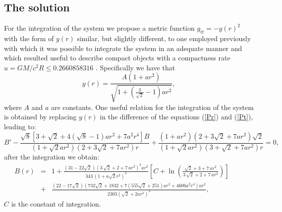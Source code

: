 \documentclass[12pt,onecolumn,a4paper]{article}
\begin{document}
\subsection{The solution}
For the integration of the system we propose a metric function $g_{tt}=-y(r)^2$ with the form of $y(r)$ similar, but slightly different, to one employed previously with which it was possible to integrate the system in an adequate manner and which resulted useful to describe compact objects with a compactness rate $u=GM/c^2R\leq 0.2660858316$ \cite{Estevez2019b} . Specifically we have that 
\begin{equation}
y \left( r \right) ={\frac {A \left( 1+a{r}^{2} \right) }{\sqrt {1+
 \left( \frac{3}{\sqrt {2} } -1\right) a{r}^{2}}}},
 \label{y}
\end{equation}
where $A$ and  $a$ are constants. One useful relation for the integration of the system is obtained by replacing $y(r)$ in the difference of the equations (\ref{Pr}) and (\ref{Pt}), leading to:
$$
B' -{\frac {\sqrt {8}[3+\sqrt {2}+4(\sqrt {8}-1)a{r}^{2}+7{a}^{2}{r}^{4}] B  }{( 1+\sqrt {2}a{r}^{2} )  \left( 2+3\sqrt {2}+7a{r}^{2} \right) r}}+{\frac { ( 1+a{r}^{2})  (2+ 3\sqrt {2}+7a{r}^{2}) 
\sqrt {2}}{ ( 1+\sqrt {2}a{r}^{2} )  (3+ \sqrt {2}+7a{r}^{2} ) r}}=0, 
$$ 
after the integration we obtain:
\begin{eqnarray}
B \left( r \right) &=&1+{\frac { \left( 31 -22\sqrt {2}  \right)  \left( 3\,\sqrt {2}+2+7\,a{r}^{2} \right) ^{3}a{r}^{2}}{343\, \left( 1+a\sqrt {2}{r}^{2} \right) ^{3}} \left[  C+\ln  \left( {\frac {\sqrt {2}+3+7\,a{r}^{2}}{3
\,\sqrt {2}+2+7\,a{r}^{2}}} \right)  \right] }\qquad \nonumber\\
&+&
{\frac { \left( 22-17\sqrt {2} \right)  \left( 732\sqrt {2}+ 1832+7\left( 555\sqrt {2}+251 \right) a{r}^{2}+4606{a}^{2}{r}^{
4} \right) a{r}^{2}}{2303\left( \sqrt {2}+2a{r}^{2} \right) ^{3}}
}
\label{B},
\end{eqnarray}
$C$ is the constant of integration.
\end{document}
